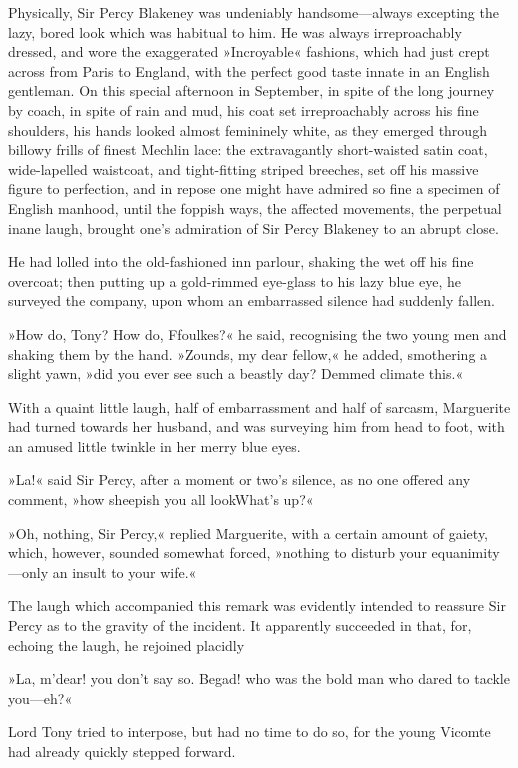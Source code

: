 Physically, Sir Percy Blakeney was undeniably  handsome—always excepting the lazy, bored look which was habitual to him. He was always irreproachably dressed, and wore the exaggerated »Incroyable« fashions, which had just crept across from Paris to England, with the perfect good taste innate in an English gentleman. On this special afternoon in September, in spite of the long journey by coach, in spite of rain and mud, his coat set irreproachably across his fine shoulders, his hands looked almost femininely white, as they emerged through billowy frills of finest Mechlin lace: the extravagantly short-waisted satin coat, wide-lapelled waistcoat, and tight-fitting striped breeches, set off his massive figure to perfection, and in repose one might have admired so fine a specimen of English manhood, until the foppish ways, the affected movements, the perpetual inane laugh, brought one's admiration of Sir Percy Blakeney to an abrupt close.

He had lolled into the old-fashioned inn parlour, shaking the wet off his fine overcoat; then putting up a gold-rimmed eye-glass to his lazy blue eye, he surveyed the company, upon whom an embarrassed silence had suddenly fallen.

»How do, Tony? How do, Ffoulkes?« he said, recognising the two young men and shaking them by the hand. »Zounds, my dear fellow,« he added, smothering a slight yawn, »did you ever see such a beastly day? Demmed climate this.«

With a quaint little laugh, half of embarrassment and half of sarcasm, Marguerite had turned towards her husband, and was surveying him from head to foot, with an amused little twinkle in her merry blue eyes.

»La!« said Sir Percy, after a moment or two's silence, as no one offered any comment, »how sheepish you all look\textellipsis \allowbreak  What's up?«

»Oh, nothing, Sir Percy,« replied Marguerite, with a certain amount of gaiety, which, however, sounded somewhat forced, »nothing to disturb your equanimity—only an insult to your wife.«

The laugh which accompanied this remark was evidently intended to reassure Sir Percy as to the gravity of the incident. It apparently succeeded in that, for, echoing the laugh, he rejoined placidly\longdash


»La, m'dear! you don't say so. Begad! who was the bold man who dared to tackle you—eh?«

Lord Tony tried to interpose, but had no time to do so, for the young Vicomte had already quickly stepped forward.

